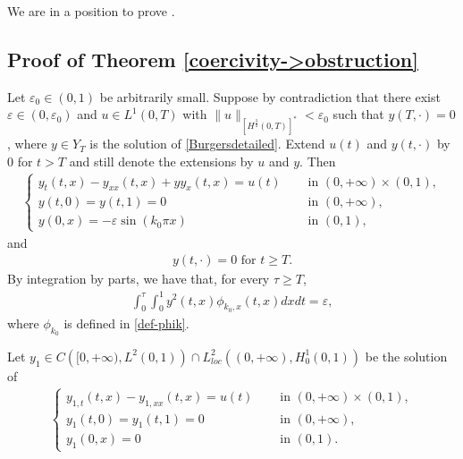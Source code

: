 \documentclass[11pt, reqno]{amsart}
\theoremstyle{plain}
\numberwithin{equation}{section}
\begin{document}
We are in a position to prove .
       
\subsection{Proof of Theorem \ref{coercivity->obstruction}} 	\label{sub-sec-mainproof}   

Let $\varepsilon_0 \in (0, 1)$ be arbitrarily small. Suppose by contradiction that there exist $\varepsilon \in (0, \varepsilon_0)$ and  $u \in L^1(0, T)$ with $\| u\|_{[H^{\frac{3}{4}}(0, T)]^*} < \varepsilon_0$ such that $y(T, \cdot) = 0$, where $y \in Y_T$ is the solution of \eqref{Burgersdetailed}. Extend $u(t)$ and $y (t, \cdot)$  by $0$ for $t > T$ and still denote the extensions by $u$ and $y$.  Then 
       \begin{align}   \label{Burgersdetailed2T}
            \begin{cases}
                y_t (t, x) - y_{xx} (t, x) + yy_x (t, x) = u(t) \quad &\text{ in } (0, +\infty) \times (0, 1), \\[6pt]
                y(t, 0) = y(t, 1) = 0 &\text{ in } (0, +\infty), \\[6pt]
                y(0, x) =  - \varepsilon \sin (k_0 \pi x) &\text{ in } (0, 1),
            \end{cases}
        \end{align}
and
\begin{align}	\label{y>T=0}
	y(t, \cdot) = 0 \mbox{ for } t \ge T. 
\end{align}
By integration by parts, we have that, for every $\tau \geq T$,
 \begin{align}	\label{step2-claim-neven}
           \int_0^{\tau} \int_0^1  y^2(t, x) \phi_{k_0, x}(t, x) dx dt = 	\varepsilon,      
        \end{align}
        where $\phi_{k_0}$ is defined in \eqref{def-phik}.

\medskip

    Let $y_1 \in C\left([0, +\infty), L^2(0, 1) \right) \cap L^2_{loc} \left((0, +\infty), H^1_0(0, 1) \right)$  be the solution of 
        \begin{align}	\label{step2-y1}
            \begin{cases}
                y_{1, t} (t, x) - y_{1, xx} (t, x) = u(t) \quad &\text{ in } (0, +\infty) \times (0, 1), \\[6pt]
                y_1(t,0) = y_1(t,1) = 0 &\text{ in } (0, +\infty), \\[6pt]
                y_1(0, x) = 0 &\text{ in } (0, 1).
            \end{cases}
        \end{align}             
      
\end{document}
